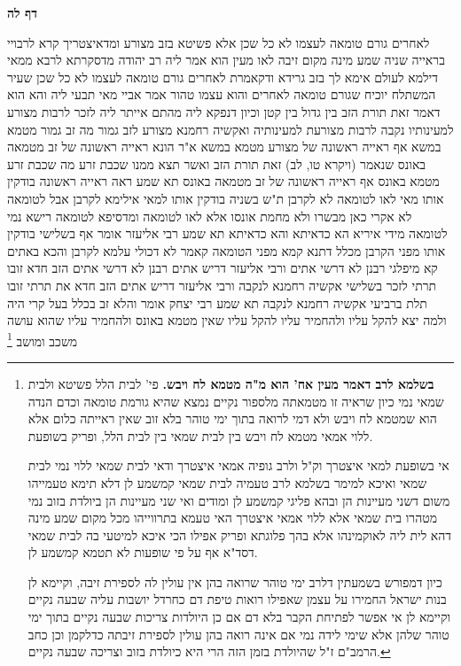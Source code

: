 \documentclass[12pt, openany]{book}
\newcommand{\sethebfont}{
\fontsize{10.5pt}{21.0pt} \selectfont
}
\newcommand{\twocol}[1]{
	{\sethebfont \begin{multicols}{2}
			#1
	\end{multicols}}	
}
\newcommand{\sectname}{}
\newcommand{\newsection}[1]{
	\addcontentsline{toc}{section}{#1}
	\renewcommand{\sectname}{#1}	
	\vspace{-\baselineskip}
	\begin{center}
		\textbf{%
\fontsize{16pt}{16pt}\selectfont
			#1}
	\end{center}
	\vspace{-\baselineskip}
	\nopagebreak
}
\newcommand{\footnotecomment}[1]{\footnote{#1}}
\newcommand{\commenta}[1]{\footnotecomment{#1}}
\begin{document}
\newsection{דף לה}
\twocol{לאחרים גורם טומאה לעצמו לא כל שכן  אלא פשיטא בזב מצורע
ומדאיצטריך קרא לרבויי בראייה שניה שמע מינה  מקום זיבה לאו מעין הוא 
אמר ליה רב יהודה מדסקרתא לרבא  ממאי  דילמא לעולם אימא לך בזב גרידא ודקאמרת לאחרים גורם טומאה לעצמו לא כל שכן שעיר המשתלח יוכיח שגורם טומאה לאחרים והוא עצמו טהור 
אמר אביי  מאי תבעי ליה  והא הוא דאמר זאת תורת הזב בין גדול בין קטן וכיון דנפקא ליה מהתם אייתר ליה לזכר לרבות מצורע למעינותיו נקבה לרבות מצורעת למעינותיה
ואקשיה רחמנא מצורע לזב גמור מה זב גמור מטמא במשא אף ראייה ראשונה של מצורע מטמא במשא 
א"ר הונא  ראייה ראשונה של זב מטמאה באונס שנאמר  (ויקרא טו, לב) זאת תורת הזב ואשר תצא ממנו שכבת זרע מה שכבת זרע מטמא באונס אף ראייה ראשונה של זב מטמאה באונס 
תא שמע  ראה ראייה ראשונה בודקין אותו  מאי לאו לטומאה  לא לקרבן 
ת"ש  בשניה בודקין אותו  למאי  אילימא לקרבן אבל לטומאה לא אקרי כאן מבשרו ולא מחמת אונסו אלא לאו לטומאה ומדסיפא לטומאה רישא נמי לטומאה 
מידי איריא  הא כדאיתא והא כדאיתא 
תא שמע רבי אליעזר אומר  אף בשלישי בודקין אותו מפני הקרבן  מכלל דתנא קמא מפני הטומאה קאמר 
לא דכולי עלמא לקרבן והכא באתים קא מיפלגי רבנן לא דרשי אתים ורבי אליעזר דריש אתים 
רבנן לא דרשי אתים  הזב חדא זובו תרתי לזכר בשלישי אקשיה רחמנא לנקבה 
ורבי אליעזר דריש אתים  הזב חדא את תרתי זובו תלת ברביעי אקשיה רחמנא לנקבה 
תא שמע רבי יצחק אומר  והלא זב בכלל בעל קרי היה ולמה יצא להקל עליו ולהחמיר עליו  להקל עליו שאין מטמא באונס ולהחמיר עליו
שהוא עושה משכב ומושב 
\commenta{\textbf{בשלמא לרב דאמר מעין אח' הוא מ"ה מטמא לח ויבש.}  פי' לבית הלל פשיטא ולבית שמאי נמי כיון שראיה זו מטמאתה מלספור נקיים נמצא שהיא גורמת טומאה וכדם הנדה הוא שמטמא לח ויבש ולא דמי לרואה בתוך ימי טוהר בלא זוב שאין ראייתה כלום אלא ללוי אמאי מטמא לח ויבש בין לבית שמאי בין לבית הלל, ופריק בשופעת.\par  אי בשופעת למאי איצטרך וק"ל ולרב גופיה אמאי איצטרך ודאי לבית שמאי ללוי נמי לבית שמאי ואיכא למימר בשלמא לרב טעמיה לבית שמאי קמשמע לן דלא תימא טעמייהו משום דשני מעיינות הן ובהא פליגי קמשמע לן ומודים ואי שני מעיינות הן ביולדת בזוב נמי מטהרו בית שמאי אלא ללוי אמאי איצטרך האי טעמא בתרווייהו מכל מקום שמע מינה דהא לית ליה לאוקמינהו אלא בהך פלוגתא ופריק אפילו הכי איכא למיטעי בה לבית שמאי דסד"א אף על פי שופעות לא תטמא קמשמע לן.\par  כיון דמפורש בשמעתין דלרב ימי טוהר שרואה בהן אין עולין לה לספירת זיבה, וקיימא לן בנות ישראל החמירו על עצמן שאפילו רואות טיפת דם כחרדל יושבות עליה שבעה נקיים וקיימא לן אי אפשר לפתיחת הקבר בלא דם אם כן היולדות צריכות שבעה נקיים בתוך ימי טוהר שלהן אלא שימי לידה נמי אם אינה רואה בהן עולין לספירת זיבתה כדלקמן וכן כחב הרמב"ם ז"ל שהיולדת בזמן הזה הרי היא כיולדת בזוב וצריכה שבעה נקיים. }

}
\end{document}
